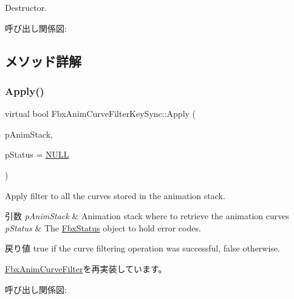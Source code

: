 Destructor. 

呼び出し関係図\+:


\subsection{メソッド詳解}
\mbox{\label{class_fbx_anim_curve_filter_key_sync_a4eb3dd7372f7747bcae1be8722db75e0}} 
\subsubsection{\texorpdfstring{Apply()}{Apply()}\hspace{0.1cm}{\footnotesize\ttfamily [1/5]}}
{\footnotesize\ttfamily virtual bool Fbx\+Anim\+Curve\+Filter\+Key\+Sync\+::\+Apply (\begin{DoxyParamCaption}\item[{\hyperlink{class_fbx_anim_stack}{Fbx\+Anim\+Stack} $\ast$}]{p\+Anim\+Stack,  }\item[{\hyperlink{class_fbx_status}{Fbx\+Status} $\ast$}]{p\+Status = {\ttfamily \hyperlink{fbxarch_8h_a070d2ce7b6bb7e5c05602aa8c308d0c4}{N\+U\+LL}} }\end{DoxyParamCaption})\hspace{0.3cm}{\ttfamily [virtual]}}

Apply filter to all the curves stored in the animation stack. 
\begin{DoxyParams}{引数}
{\em p\+Anim\+Stack} & Animation stack where to retrieve the animation curves \\
\hline
{\em p\+Status} & The \hyperlink{class_fbx_status}{Fbx\+Status} object to hold error codes. \\
\hline
\end{DoxyParams}
\begin{DoxyReturn}{戻り値}
{\ttfamily true} if the curve filtering operation was successful, {\ttfamily false} otherwise. 
\end{DoxyReturn}


\hyperlink{class_fbx_anim_curve_filter_aef3900e6180e05661c27ee484ae939c3}{Fbx\+Anim\+Curve\+Filter}を再実装しています。

呼び出し関係図\+:
\mbox{\label{class_fbx_anim_curve_filter_key_sync_a0a46860b4847773c09ea2c57f77f11dd}} 
